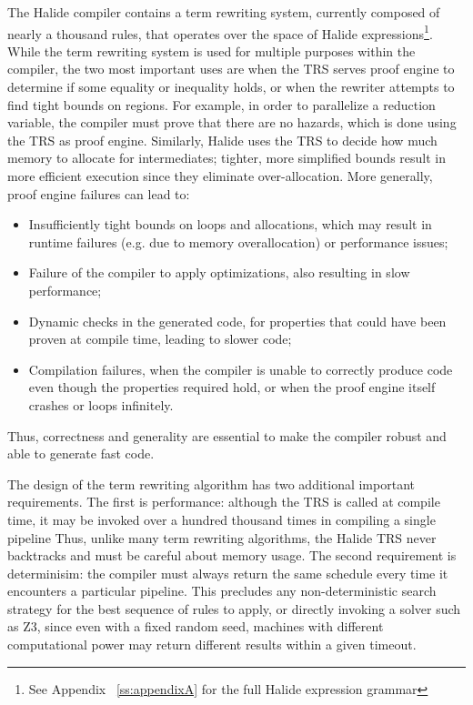 \documentclass[sigplan,10pt,review,anonymous]{acmart}\settopmatter{printfolios=true,printccs=false,printacmref=false}
\begin{document}
The Halide compiler contains a term rewriting system, currently composed of
nearly a thousand rules, that operates over the space of Halide
expressions\footnote{See Appendix ~\ref{ss:appendixA} for the full Halide
  expression grammar}. While the term rewriting system is used for multiple
purposes within the compiler, the two most important
uses are when the TRS serves proof engine to determine if
some equality or inequality holds, or when the rewriter attempts to find tight
bounds on regions. For example, in order to parallelize a
reduction variable, the compiler must prove that there are no hazards, which is
done using the TRS as proof engine.  Similarly, Halide uses
the TRS to decide how much memory to allocate for intermediates; tighter, more
simplified bounds result in more efficient execution since they eliminate over-allocation.
More generally, proof engine failures can lead to:
\begin{itemize}
\item Insufficiently tight bounds on loops and allocations, which may result in
  runtime failures (e.g. due to memory overallocation) or performance issues;

\item Failure of the compiler to apply optimizations, also resulting in slow performance;

\item Dynamic checks in the generated code, for properties that could have been proven
  at compile time, leading to slower code;

\item Compilation failures, when the compiler is unable to correctly produce code
  even though the properties required hold, or when the proof engine itself crashes
  or loops infinitely.
\end{itemize}
Thus, correctness and generality are essential to make the compiler robust and
able to generate fast code.

The design of the term rewriting algorithm has two additional important
requirements. The first is performance: although the TRS is called at
compile time, it may be invoked over a hundred thousand times in compiling a single pipeline
Thus, unlike many term rewriting algorithms, the Halide TRS
never backtracks and must be careful about memory usage. The second requirement is determinisim: the compiler must
always return the same schedule every time it encounters a particular pipeline.
This precludes any non-deterministic search strategy for the best sequence of
rules to apply, or directly invoking a solver such as Z3, since even with a
fixed random seed, machines with different computational power may return
different results within a given timeout.
\end{document}
